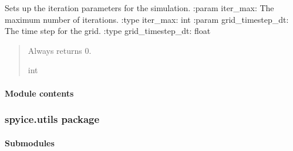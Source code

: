 \documentclass[a4paper,11pt,english,openany]{sphinxmanual}
\begin{document}

\begin{fulllineitems}
\label{\detokenize{api/spyice.preprocess.pre_process:spyice.preprocess.pre_process.set_up_iter}}
\pysigstartsignatures
{}
\pysigstopsignatures
\sphinxAtStartPar
Sets up the iteration parameters for the simulation.
:param iter\_max: The maximum number of iterations.
:type iter\_max: int
:param grid\_timestep\_dt: The time step for the grid.
:type grid\_timestep\_dt: float
\begin{quote}\begin{description}
\sphinxAtStartPar
Always returns 0.

\sphinxAtStartPar
int

\end{description}\end{quote}

\end{fulllineitems}


\sphinxstepscope


\paragraph{Module contents}
\label{\detokenize{api/spyice.preprocess:module-spyice.preprocess}}\label{\detokenize{api/spyice.preprocess:module-contents}}
\sphinxstepscope


\subsubsection{spyice.utils package}
\label{\detokenize{api/spyice.utils:spyice-utils-package}}\label{\detokenize{api/spyice.utils::doc}}

\paragraph{Submodules}
\label{\detokenize{api/spyice.utils:submodules}}
\sphinxstepscope
{}\label{\detokenize{api/spyice.utils.config_sort:module-spyice.utils.config_sort}}
\end{document}
